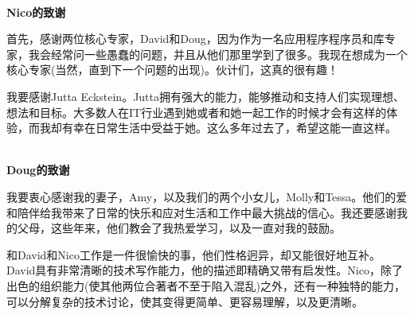 \hspace*{\fill} \\ %
\noindent\textbf{Nico的致谢}

首先，感谢两位核心专家，David和Doug，因为作为一名应用程序程序员和库专家，我会经常问一些愚蠢的问题，并且从他们那里学到了很多。我现在想成为一个核心专家(当然，直到下一个问题的出现)。伙计们，这真的很有趣！

我要感谢Jutta Eckstein。Jutta拥有强大的能力，能够推动和支持人们实现理想、想法和目标。大多数人在IT行业遇到她或者和她一起工作的时候才会有这样的体验，而我却有幸在日常生活中受益于她。这么多年过去了，希望这能一直这样。

\hspace*{\fill} \\ %
\noindent\textbf{Doug的致谢}

我要衷心感谢我的妻子，Amy，以及我们的两个小女儿，Molly和Tessa。他们的爱和陪伴给我带来了日常的快乐和应对生活和工作中最大挑战的信心。我还要感谢我的父母，这些年来，他们教会了我热爱学习，以及一直对我的鼓励。

和David和Nico工作是一件很愉快的事，他们性格迥异，却又能很好地互补。David具有非常清晰的技术写作能力，他的描述即精确又带有启发性。Nico，除了出色的组织能力(使其他两位合著者不至于陷入混乱)之外，还有一种独特的能力，可以分解复杂的技术讨论，使其变得更简单、更容易理解，以及更清晰。


